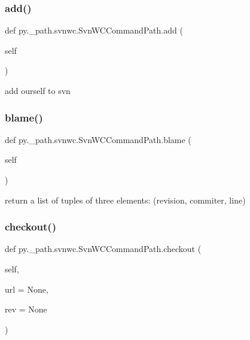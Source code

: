 \subsubsection{\texorpdfstring{add()}{add()}}
{\footnotesize\ttfamily def py.\+\_\+path.\+svnwc.\+Svn\+W\+C\+Command\+Path.\+add (\begin{DoxyParamCaption}\item[{}]{self }\end{DoxyParamCaption})}

\begin{DoxyVerb}add ourself to svn \end{DoxyVerb}
 \mbox{\label{classpy_1_1__path_1_1svnwc_1_1_svn_w_c_command_path_a2e91cc705fae01b9e52aa2e323471513}} 
\subsubsection{\texorpdfstring{blame()}{blame()}}
{\footnotesize\ttfamily def py.\+\_\+path.\+svnwc.\+Svn\+W\+C\+Command\+Path.\+blame (\begin{DoxyParamCaption}\item[{}]{self }\end{DoxyParamCaption})}

\begin{DoxyVerb}return a list of tuples of three elements:
    (revision, commiter, line)
\end{DoxyVerb}
 \mbox{\label{classpy_1_1__path_1_1svnwc_1_1_svn_w_c_command_path_a8f6c6f449e1ed0e8372d3dcd38b50edf}} 
\subsubsection{\texorpdfstring{checkout()}{checkout()}}
{\footnotesize\ttfamily def py.\+\_\+path.\+svnwc.\+Svn\+W\+C\+Command\+Path.\+checkout (\begin{DoxyParamCaption}\item[{}]{self,  }\item[{}]{url = {\ttfamily None},  }\item[{}]{rev = {\ttfamily None} }\end{DoxyParamCaption})}

